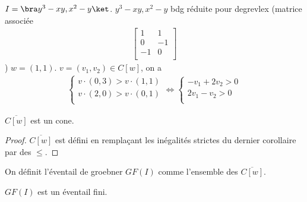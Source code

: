         \begin{expl}
            $I = \bra y^3 - xy, x^2 - y \ket$. $y^3 - xy, x^2 - y$ bdg réduite pour degrevlex (matrice associée
            \begin{align*}
                \begin{bmatrix}
                    1 & 1 \\
                    0 & -1 \\
                    -1 & 0 \\
                \end{bmatrix}
            \end{align*})
            $w = (1,1)$. $v = (v_1, v_2) \in C[w]$, on a 
            \begin{align*}
                \begin{cases}
                    v \cdot (0,3) > v \cdot (1,1) \\
                    v \cdot (2,0) > v \cdot (0,1) \\
                \end{cases}
                \iff \begin{cases}
                    -v_1 + 2v_2 > 0 \\
                    2v_1 - v_2 > 0 \\
                \end{cases}
            \end{align*}
        \end{expl}
        \begin{coro}
            $\overline{C[w]}$ est un cone.
        \end{coro}
        \begin{proof}
            $\overline{C[w]}$ est défini en remplaçant les inégalités strictes du dernier corollaire par des $\leq$.
        \end{proof}
        \begin{defi}
            On définit l'éventail de groebner $GF(I)$ comme l'ensemble des $\overline{C[w]}$.
        \end{defi}
        \begin{theo}
            $GF(I)$ est un éventail fini.
        \end{theo}

